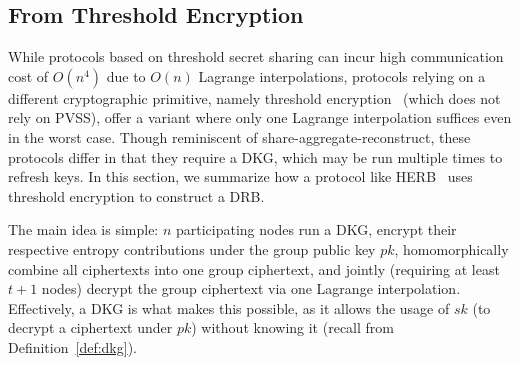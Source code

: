 \subsection{From Threshold Encryption}
While protocols based on threshold secret sharing can incur high communication cost of $O(n^4)$ due to $O(n)$ Lagrange interpolations, protocols relying on a different cryptographic primitive, namely threshold encryption~\cite{desmedt1990Threshold} (which does not rely on PVSS), offer a variant where only one Lagrange interpolation suffices even in the worst case. Though reminiscent of share-aggregate-reconstruct, these protocols differ in that they require a DKG, which may be run multiple times to refresh keys. In this section, we summarize how a protocol like HERB~\cite{cherniaeva2019homomorphic} uses threshold encryption to construct a DRB.

The main idea is simple: $n$ participating nodes run a DKG, encrypt their respective entropy contributions under the group public key $pk$, homomorphically combine all ciphertexts into one group ciphertext, and jointly (requiring at least $t + 1$ nodes) decrypt the group ciphertext via one Lagrange interpolation. Effectively, a DKG is what makes this possible, as it allows the usage of $sk$ (to decrypt a ciphertext under $pk$) without knowing it (recall from Definition~\ref{def:dkg}).



